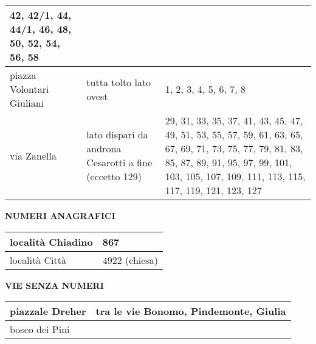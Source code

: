 \begin{center}
\begin{tabularx}{\textwidth}{| s | s | X |}
		42, 42/1, 44, 44/1, 46, 48, 50, 52, 54, 56, 58\\
		\hline
		piazza Volontari Giuliani&
		tutta tolto lato ovest&
		1, 2, 3, 4, 5, 6, 7, 8\\
		\hline
		via Zanella&
		lato dispari da androna Cesarotti a fine (eccetto 129)&
		29, 31, 33, 35, 37, 41, 43, 45, 47, 49, 51, 53, 55, 57, 59, 61, 63, 65, 67, 69, 71, 73, 75, 77, 79, 81, 83, 85, 87, 89, 91, 95, 97, 99, 
		101, 103, 105, 107, 109, 111, 113, 115, 117, 119, 121, 123, 127\\
		\hline
	\end{tabularx}
\end{center}
\begin{center}
\textbf{NUMERI ANAGRAFICI}
	\small
	\begin{tabularx}{\textwidth}{| s | X |}
		\hline
		località Chiadino&
		867\\
		\hline
		località Città&
		4922 (chiesa)\\
		\hline
	\end{tabularx}
\end{center}
\begin{center}
\textbf{VIE SENZA NUMERI}
	\small
	\begin{tabularx}{\textwidth}{| s | X |}
		\hline
		piazzale Dreher&
		tra le vie Bonomo, Pindemonte, Giulia\\
		\hline
		bosco dei Pini&\\
		\hline
	\end{tabularx}
\end{center}
\newpage